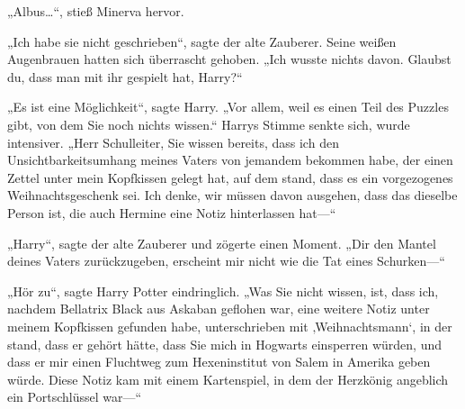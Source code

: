 „Albus…“, stieß Minerva hervor.

„Ich habe sie nicht geschrieben“, sagte der alte Zauberer. Seine weißen Augenbrauen hatten sich überrascht gehoben. „Ich wusste nichts davon. Glaubst du, dass man mit ihr gespielt hat, Harry?“

„Es ist eine Möglichkeit“, sagte Harry. „Vor allem, weil es einen Teil des Puzzles gibt, von dem Sie noch nichts wissen.“ Harrys Stimme senkte sich, wurde intensiver. „Herr Schulleiter, Sie wissen bereits, dass ich den Unsichtbarkeitsumhang meines Vaters von jemandem bekommen habe, der einen Zettel unter mein Kopfkissen gelegt hat, auf dem stand, dass es ein vorgezogenes Weihnachtsgeschenk sei. Ich denke, wir müssen davon ausgehen, dass das dieselbe Person ist, die auch Hermine eine Notiz hinterlassen hat—“

„Harry“, sagte der alte Zauberer und zögerte einen Moment. „Dir den Mantel deines Vaters zurückzugeben, erscheint mir nicht wie die Tat eines Schurken—“

„Hör zu“, sagte Harry Potter eindringlich. „Was Sie nicht wissen, ist, dass ich, nachdem Bellatrix Black aus Askaban geflohen war, eine weitere Notiz unter meinem Kopfkissen gefunden habe, unterschrieben mit ‚Weihnachtsmann‘, in der stand, dass er gehört hätte, dass Sie mich in Hogwarts einsperren würden, und dass er mir einen Fluchtweg zum Hexeninstitut von Salem in Amerika geben würde. Diese Notiz kam mit einem Kartenspiel, in dem der Herzkönig angeblich ein Portschlüssel war—“


